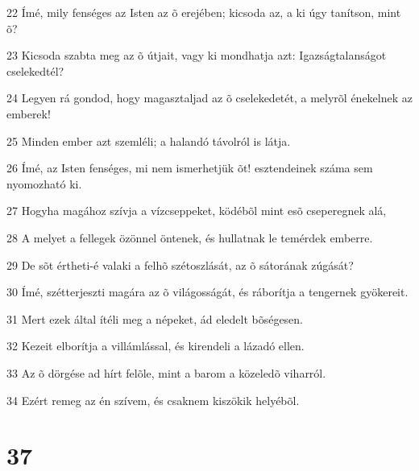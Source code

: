 \par 22 Ímé, mily fenséges az Isten az õ erejében; kicsoda az, a ki úgy tanítson, mint õ?
\par 23 Kicsoda szabta meg az õ útjait, vagy ki mondhatja azt: Igazságtalanságot cselekedtél?
\par 24 Legyen rá gondod, hogy magasztaljad az õ cselekedetét, a melyrõl énekelnek az emberek!
\par 25 Minden ember azt szemléli; a halandó távolról is látja.
\par 26 Ímé, az Isten fenséges, mi nem ismerhetjük õt! esztendeinek száma sem nyomozható ki.
\par 27 Hogyha magához szívja a vízcseppeket, ködébõl mint esõ cseperegnek alá,
\par 28 A melyet a fellegek özönnel öntenek, és hullatnak le temérdek emberre.
\par 29 De sõt értheti-é valaki a felhõ szétoszlását, az õ sátorának zúgását?
\par 30 Ímé, szétterjeszti magára az õ világosságát, és ráborítja a tengernek gyökereit.
\par 31 Mert ezek által ítéli meg a népeket, ád eledelt bõségesen.
\par 32 Kezeit elborítja a villámlással, és kirendeli a lázadó ellen.
\par 33 Az õ dörgése ad hírt felõle, mint a barom a közeledõ viharról.
\par 34 Ezért remeg az én szívem, és csaknem kiszökik helyébõl.

\chapter{37}

